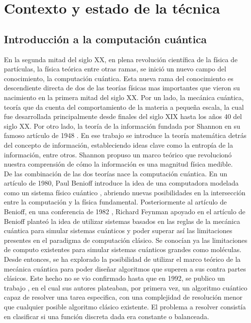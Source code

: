 \chapter{Contexto y estado de la técnica}

\section{Introducción a la computación cuántica}

En la segunda mitad del siglo XX, en plena revolución científica de la física de partículas, la física teórica entre otras ramas, se inició un nuevo campo del conocimiento, la computación cuántica. Esta nueva rama del conocimiento es descendiente directa de dos de las teorías físicas mas importantes que vieron su nacimiento en la primera mitad del siglo XX. Por un lado, la mecánica cuántica, teoría que da cuenta del comportamiento de la materia a pequeña escala, la cual fue desarrollada principalmente desde finales del siglo XIX hasta los años 40 del siglo XX. Por otro lado, la teoría de la información fundada por Shannon en su famoso artículo de 1948 \citep{Shannon1948}. En ese trabajo se introduce la teoría matemática detrás del concepto de información, estableciendo ideas clave como la entropía de la información, entre otros. Shannon propuso un marco teórico que revolucionó nuestra comprensión de cómo la información es una magnitud física medible. \\

De las combinación de las dos teorías nace la computación cuántica. En un artículo de 1980, Paul Benioff introduce la idea de una computadora modelada como un sistema físico cuántico \citep{benioff}, abriendo nuevas posibilidades en la intersección entre la computación y la física fundamental. Posteriormente al artículo de Benioff, en una conferencia de 1982 \citep{richard}, Richard Feynman apoyado en el artículo de Benioff planteó la idea de utilizar sistemas basados en las reglas de la mecánica cuántica para simular sistemas cuánticos y poder superar así las limitaciones presentes en el paradigma de computación clásico. Se conocían ya las limitaciones de computo existentes para simular sistemas cuánticos grandes como moléculas. \\

Desde entonces, se ha explorado la posibilidad de utilizar el marco teórico de la mecánica cuántica para poder diseñar algoritmos que superen a sus contra partes clásicos. Este hecho no se vio confirmado hasta que en 1992, se publico un trabajo \citep{deutsch}, en el cual sus autores plateaban, por primera vez, un algoritmo cuántico capaz de resolver una tarea especifica, con una complejidad de resolución menor que cualquier posible algoritmo clásico existente. El problema a resolver consistía en clasificar si una función discreta dada era constante o balanceada. \\

